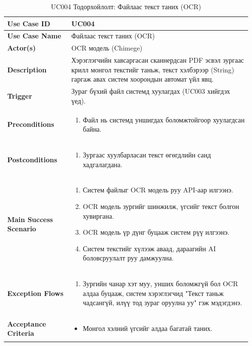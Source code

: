 \begin{longtable}{|p{4cm}|p{11cm}|}
\caption{UC004 Тодорхойлолт: Файлаас текст таних (OCR)} \\
\hline
\textbf{Use Case ID} & UC004 \\ \hline
\textbf{Use Case Name} & Файлаас текст таних (OCR) \\ \hline
\textbf{Actor(s)} & OCR модель (Chimege) \\ \hline
\textbf{Description} & Хэрэглэгчийн хавсаргасан сканнердсан PDF эсвэл зургаас крилл монгол текстийг таньж, текст хэлбэрээр (String) гаргаж авах систем хоорондын автомат үйл явц. \\ \hline
\textbf{Trigger} & Зураг бүхий файл системд хуулагдах (UC003 хийгдэх үед). \\ \hline
\textbf{Preconditions} & 
\begin{enumerate}
    \item Файл нь системд уншигдах боломжтойгоор хуулагдсан байна.
\end{enumerate} \\ \hline
\textbf{Postconditions} & 
\begin{enumerate}
    \item Зургаас хуулбарласан текст өгөгдлийн санд хадгалагдана.
\end{enumerate} \\ \hline
\textbf{Main Success Scenario} & 
\begin{enumerate}
    \item Систем файлыг OCR модель руу API-аар илгээнэ.
    \item OCR модель зургийг шинжилж, үгсийг текст болгон хувиргана.
    \item OCR модель үр дүнг буцааж систем рүү илгээнэ.
    \item Систем текстийг хүлээж аваад, дараагийн AI боловсруулалт руу дамжуулна.
\end{enumerate} \\ \hline
\textbf{Exception Flows} & 
\begin{enumerate}
    \item[2a.] Зургийн чанар хэт муу, унших боломжгүй бол OCR алдаа буцааж, систем хэрэглэгчид "Текст таньж чадсангүй, илүү тод зураг оруулна уу" гэж мэдэгдэнэ.
\end{enumerate} \\ \hline
\textbf{Acceptance Criteria} & 
\begin{itemize}
    \item Монгол хэлний үгсийг алдаа багатай таних.
\end{itemize} \\ \hline
\end{longtable}

